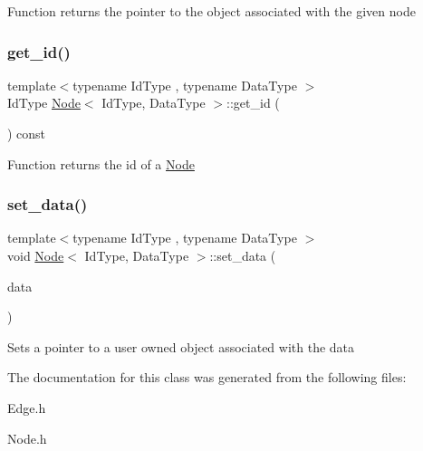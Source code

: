 Function returns the pointer to the object associated with the given node \mbox{\label{class_node_a86f1bba05a74b854ba12dc3ac3d1f491}} 
\subsubsection{\texorpdfstring{get\+\_\+id()}{get\_id()}}
{\footnotesize\ttfamily template$<$typename Id\+Type , typename Data\+Type $>$ \\
Id\+Type \hyperlink{class_node}{Node}$<$ Id\+Type, Data\+Type $>$\+::get\+\_\+id (\begin{DoxyParamCaption}{ }\end{DoxyParamCaption}) const\hspace{0.3cm}{\ttfamily [inline]}}

Function returns the id of a \hyperlink{class_node}{Node} \mbox{\label{class_node_a29f690cf38cfd834ebc6ad6037275cf0}} 
\subsubsection{\texorpdfstring{set\+\_\+data()}{set\_data()}}
{\footnotesize\ttfamily template$<$typename Id\+Type , typename Data\+Type $>$ \\
void \hyperlink{class_node}{Node}$<$ Id\+Type, Data\+Type $>$\+::set\+\_\+data (\begin{DoxyParamCaption}\item[{Data\+Type $\ast$}]{data }\end{DoxyParamCaption})\hspace{0.3cm}{\ttfamily [inline]}}

Sets a pointer to a user owned object associated with the data 

The documentation for this class was generated from the following files\+:\begin{DoxyCompactItemize}
\item 
Edge.\+h\item 
Node.\+h\end{DoxyCompactItemize}
